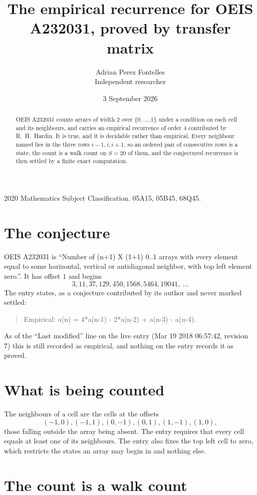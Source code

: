 \documentclass[11pt,a4paper]{article}
\title{The empirical recurrence for OEIS A232031, proved by transfer matrix}
\author{Adrian Perez Fontelles\\ \small Independent researcher}
\date{3 September 2026}
\theoremstyle{plain}
\theoremstyle{definition}
\begin{document}
\maketitle

\begin{abstract}
OEIS A232031 counts arrays of width $2$ over $\{0,\dots,1\}$ under a condition on each cell
and its neighbours, and carries an empirical recurrence of order $4$ contributed by
R.~H.~Hardin. It is true, and it is decidable rather than empirical. Every neighbour named lies
in the three rows $i-1,i,i+1$, so an ordered pair of consecutive rows is a state, the count is
a walk count on $S=20$ of them, and the conjectured recurrence is then settled by a finite
exact computation.
\end{abstract}

\noindent\small 2020 Mathematics Subject Classification. 05A15, 05B45, 68Q45.\normalsize

\section{The conjecture}

OEIS A232031 is ``Number of (n+1) X (1+1) 0..1 arrays with every element equal to some horizontal, vertical or antidiagonal neighbor, with top left element zero.''. It has offset $1$ and begins
\[
3, 11, 37, 129, 450, 1568, 5464, 19041,\ \dots
\]
The entry states, as a conjecture contributed by its author and never marked settled:
\begin{quote}
Empirical: a(n) = 4*a(n-1) - 2*a(n-2) + a(n-3) - a(n-4).
\end{quote}
As of the ``Last modified'' line on the live entry (Mar 19 2018 06:57:42, revision 7) this is still
recorded as empirical, and nothing on the entry records it as proved.

\section{What is being counted}

The neighbours of a cell are the cells at the offsets
\[
(-1,0), (-1,1), (0,-1), (0,1), (1,-1), (1,0),
\]
those falling outside the array being absent. The entry requires that every cell equals at least one of its neighbours. The entry also fixes the top left cell to zero, which restricts the states an array may begin in and nothing else.

\section{The count is a walk count}
\end{document}
